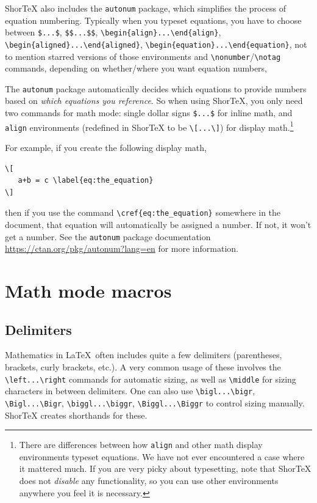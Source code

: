 \documentclass{article}
\begin{document}
ShorTeX also includes the \texttt{autonum} package, which simplifies the process of
equation numbering. Typically when you typeset equations, you have to choose between
\verb!$...$!, \verb!$$...$$!,
\verb!\begin{align}...\end{align}!,
\verb!\begin{aligned}...\end{aligned}!,
\verb!\begin{equation}...\end{equation}!,
not to mention starred versions of those environments
and \verb!\nonumber!/\verb!\notag! commands, depending
on whether/where you want equation numbers,

The \texttt{autonum} package automatically decides which equations to provide
numbers based on \textit{which equations you reference}. So when using ShorTeX,
you only need two commands for math mode: single dollar signs \verb!$...$! for
inline math, and \texttt{align} environments (redefined in ShorTeX to be
\verb!\[...\]!) for display math.\footnote{There are
	differences between how \texttt{align} and
	other math display environments typeset equations. We have not ever
	encountered a case where it mattered much. If you are very picky about typesetting,
	note that ShorTeX does not \emph{disable} any functionality, so you
	can use other environments anywhere you feel it is necessary.}

For example, if you create
the following display math,
\begin{verbatim}
\[
   a+b = c \label{eq:the_equation}
\]
\end{verbatim}
then if you use the command \verb!\cref{eq:the_equation}! somewhere
in the document, that equation will automatically be assigned a number. If not, it
won't get a number. See the \texttt{autonum} package
documentation \url{https://ctan.org/pkg/autonum?lang=en} for more information.



\section{Math mode macros}

\subsection{Delimiters}

Mathematics in \LaTeX~often includes quite a few delimiters (parentheses, brackets, curly brackets, etc.).
A very common usage of these involves the \verb!\left...\right! commands for automatic sizing, as well as \verb!\middle!
for sizing characters in between delimiters.
One can also use \verb!\bigl...\bigr!, \verb!\Bigl...\Bigr!, \verb!\biggl...\biggr!, \verb!\Biggl...\Biggr! to control sizing manually.
ShorTeX creates shorthands for these.
\end{document}
